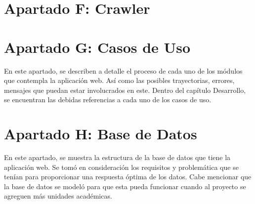 	\chapter{Apartado F: Crawler}
		\label{crawler}
	

	\chapter{Apartado G: Casos de Uso}
	\noindent En este apartado, se describen a detalle el proceso de cada uno de los módulos que contempla la aplicación web. Así como las posibles trayectorias, errores, mensajes que puedan estar involucrados en este. 
	Dentro del capítulo Desarrollo, se encuentran las debidas referencias a cada uno de los casos de uso.
	
		\label{CasosdeUso}
		
		
		
		
		
		
		
		
		
		
		
		 
		 
		
		
		
		
		
		
		
		
		
		
		
		
		
		
		
		
		
		
		
		
		
	\pagebreak	
	
	\chapter{Apartado H: Base de Datos}
	\noindent En este apartado, se muestra la estructura de la base de datos que tiene la aplicación web. Se tomó en consideración los requisitos y problemática que se tenían para proporcionar una respuesta óptima de los datos. Cabe mencionar que la base de datos se modeló para que esta pueda funcionar cuando al proyecto se agreguen más unidades académicas.
	
